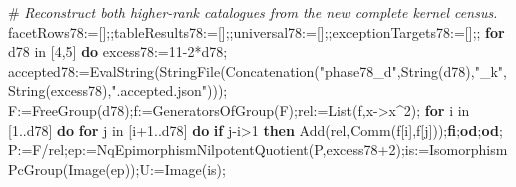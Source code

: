\documentclass[
  10pt,
  letterpaper,
]{article}
\newenvironment{Shaded}{}{}
\newcommand{\BuiltInTok}[1]{\textcolor[rgb]{0.00,0.50,0.00}{#1}}
\newcommand{\CommentTok}[1]{\textcolor[rgb]{0.38,0.63,0.69}{\textit{#1}}}
\newcommand{\ControlFlowTok}[1]{\textcolor[rgb]{0.00,0.44,0.13}{\textbf{#1}}}
\newcommand{\ExtensionTok}[1]{#1}
\newcommand{\FloatTok}[1]{\textcolor[rgb]{0.25,0.63,0.44}{#1}}
\newcommand{\NormalTok}[1]{#1}
\newcommand{\OperatorTok}[1]{\textcolor[rgb]{0.40,0.40,0.40}{#1}}
\newcommand{\StringTok}[1]{\textcolor[rgb]{0.25,0.44,0.63}{#1}}
\newcommand{\VariableTok}[1]{\textcolor[rgb]{0.10,0.09,0.49}{#1}}
\begin{document}
\begin{Shaded}
\begin{Highlighting}[]
\NormalTok{\#}\CommentTok{ Reconstruct both higher{-}rank catalogues from the new complete kernel census.}
\VariableTok{facetRows78}\OperatorTok{:=}\NormalTok{[]}\OperatorTok{;;}\VariableTok{tableResults78}\OperatorTok{:=}\NormalTok{[]}\OperatorTok{;;}\VariableTok{universal78}\OperatorTok{:=}\NormalTok{[]}\OperatorTok{;;}\VariableTok{exceptionTargets78}\OperatorTok{:=}\NormalTok{[]}\OperatorTok{;;}
\ControlFlowTok{for} \VariableTok{d78} \ExtensionTok{in}\NormalTok{ [}\FloatTok{4}\OperatorTok{,}\FloatTok{5}\NormalTok{] }\ControlFlowTok{do}
 \VariableTok{excess78}\OperatorTok{:=}\FloatTok{11}\OperatorTok{{-}}\FloatTok{2}\OperatorTok{*}\VariableTok{d78}\OperatorTok{;}
 \VariableTok{accepted78}\OperatorTok{:=}\BuiltInTok{EvalString}\NormalTok{(}\BuiltInTok{StringFile}\NormalTok{(}\BuiltInTok{Concatenation}\NormalTok{(}\StringTok{"phase78\_d"}\OperatorTok{,}\BuiltInTok{String}\NormalTok{(}\VariableTok{d78}\NormalTok{)}\OperatorTok{,}\StringTok{"\_k"}\OperatorTok{,}\BuiltInTok{String}\NormalTok{(}\VariableTok{excess78}\NormalTok{)}\OperatorTok{,}\StringTok{".accepted.json"}\NormalTok{)))}\OperatorTok{;}
 \VariableTok{F}\OperatorTok{:=}\BuiltInTok{FreeGroup}\NormalTok{(}\VariableTok{d78}\NormalTok{)}\OperatorTok{;}\VariableTok{f}\OperatorTok{:=}\BuiltInTok{GeneratorsOfGroup}\NormalTok{(}\VariableTok{F}\NormalTok{)}\OperatorTok{;}\VariableTok{rel}\OperatorTok{:=}\BuiltInTok{List}\NormalTok{(}\VariableTok{f}\OperatorTok{,}\VariableTok{x}\OperatorTok{{-}\textgreater{}}\VariableTok{x}\OperatorTok{\^{}}\FloatTok{2}\NormalTok{)}\OperatorTok{;}
 \ControlFlowTok{for} \VariableTok{i} \ExtensionTok{in}\NormalTok{ [}\FloatTok{1}\OperatorTok{..}\VariableTok{d78}\NormalTok{] }\ControlFlowTok{do} \ControlFlowTok{for} \VariableTok{j} \ExtensionTok{in}\NormalTok{ [}\VariableTok{i}\OperatorTok{+}\FloatTok{1}\OperatorTok{..}\VariableTok{d78}\NormalTok{] }\ControlFlowTok{do} \ControlFlowTok{if} \VariableTok{j}\OperatorTok{{-}}\VariableTok{i}\OperatorTok{\textgreater{}}\FloatTok{1} \ControlFlowTok{then} \BuiltInTok{Add}\NormalTok{(}\VariableTok{rel}\OperatorTok{,}\BuiltInTok{Comm}\NormalTok{(}\VariableTok{f}\NormalTok{[}\VariableTok{i}\NormalTok{]}\OperatorTok{,}\VariableTok{f}\NormalTok{[}\VariableTok{j}\NormalTok{]))}\OperatorTok{;}\ControlFlowTok{fi}\OperatorTok{;}\ControlFlowTok{od}\OperatorTok{;}\ControlFlowTok{od}\OperatorTok{;}
 \VariableTok{P}\OperatorTok{:=}\VariableTok{F}\OperatorTok{/}\VariableTok{rel}\OperatorTok{;}\VariableTok{ep}\OperatorTok{:=}\VariableTok{NqEpimorphismNilpotentQuotient}\NormalTok{(}\VariableTok{P}\OperatorTok{,}\VariableTok{excess78}\OperatorTok{+}\FloatTok{2}\NormalTok{)}\OperatorTok{;}\VariableTok{is}\OperatorTok{:=}\BuiltInTok{IsomorphismPcGroup}\NormalTok{(}\BuiltInTok{Image}\NormalTok{(}\VariableTok{ep}\NormalTok{))}\OperatorTok{;}\VariableTok{U}\OperatorTok{:=}\BuiltInTok{Image}\NormalTok{(}\VariableTok{is}\NormalTok{)}\OperatorTok{;}

\end{Highlighting}
\end{Shaded}
\end{document}
